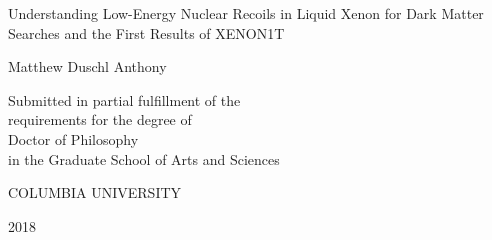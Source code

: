 
\thispagestyle{empty} %
\begin{center}
  \SingleSpace

  \vspace*{1in}

  Understanding Low-Energy Nuclear Recoils in Liquid Xenon for Dark Matter Searches and the First Results of XENON1T

  \bigskip %

  Matthew Duschl Anthony

  \vspace{5in}

  Submitted in partial fulfillment of the\\
  requirements for the degree of\\
  Doctor of Philosophy\\
  in the Graduate School of Arts and Sciences

  \bigskip
  \bigskip

  COLUMBIA UNIVERSITY

  \bigskip %

  2018
\end{center}
